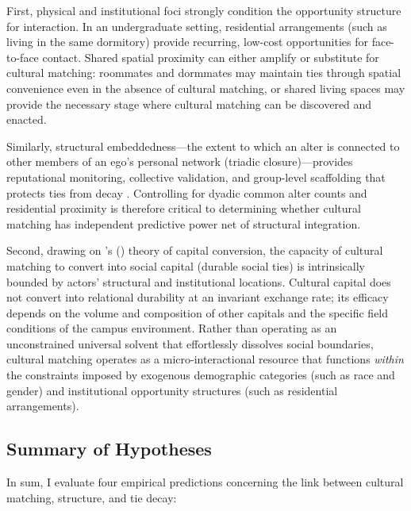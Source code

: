 \documentclass[12pt,letterpaper]{article}
\begin{document}
First, physical and institutional foci strongly condition the opportunity structure for interaction. In an undergraduate setting, residential arrangements (such as living in the same dormitory) provide recurring, low-cost opportunities for face-to-face contact. Shared spatial proximity can either amplify or substitute for cultural matching: roommates and dormmates may maintain ties through spatial convenience even in the absence of cultural matching, or shared living spaces may provide the necessary stage where cultural matching can be discovered and enacted. 

Similarly, structural embeddedness---the extent to which an alter is connected to other members of an ego's personal network (triadic closure)---provides reputational monitoring, collective validation, and group-level scaffolding that protects ties from decay \citep{granovetter1973strength-f5f, coleman1988, burt2000}. Controlling for dyadic common alter counts and residential proximity is therefore critical to determining whether cultural matching has independent predictive power net of structural integration.

Second, drawing on \citeauthor{bourdieu1986}'s (\citeyear{bourdieu1984, bourdieu1986}) theory of capital conversion, the capacity of cultural matching to convert into social capital (durable social ties) is intrinsically bounded by actors' structural and institutional locations. Cultural capital does not convert into relational durability at an invariant exchange rate; its efficacy depends on the volume and composition of other capitals and the specific field conditions of the campus environment. Rather than operating as an unconstrained universal solvent that effortlessly dissolves social boundaries, cultural matching operates as a micro-interactional resource that functions \textit{within} the constraints imposed by exogenous demographic categories (such as race and gender) and institutional opportunity structures (such as residential arrangements). 

\subsection{Summary of Hypotheses}\label{summary-of-hypotheses}

In sum, I evaluate four empirical predictions concerning the link between cultural matching, structure, and tie decay:
\end{document}
